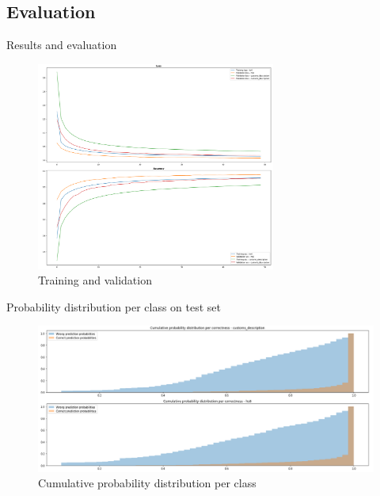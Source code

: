 \documentclass[9pt]{beamer}
\begin{document}
\subsection{Evaluation}
\begin{frame}{Results and evaluation}
\begin{figure}
		\includegraphics[width=0.7\textwidth]{imgs/training.png}
		\caption{Training and validation}
	\end{figure}
\end{frame}

\begin{frame}{Probability distribution per class on test set}
\begin{figure}
		\includegraphics[width=\textwidth]{imgs/performance.png}
		\caption{Cumulative probability distribution per class}
	\end{figure}
\end{frame}
\end{document}

